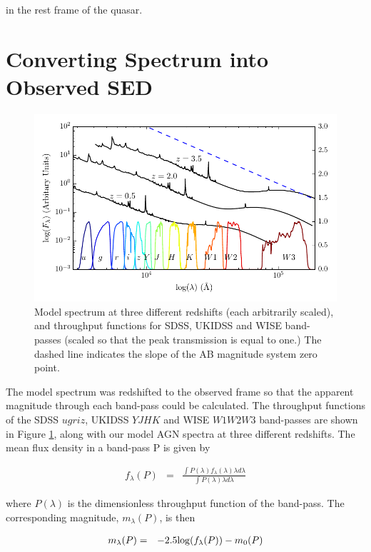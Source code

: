 in the rest frame of the quasar. 

\section{Converting Spectrum into Observed SED}

\begin{figure}
  \centering
  \includegraphics[width=\textwidth]{figures/chapter06/throughput.pdf}
  \caption{Model spectrum at three different redshifts (each arbitrarily scaled), and throughput functions for SDSS, UKIDSS and WISE band-passes (scaled so that the peak transmission is equal to one.) The dashed line indicates the slope of the AB magnitude system zero point.}
  \label{fig:filters}
\end{figure}

The model spectrum was redshifted to the observed frame so that the apparent magnitude through each band-pass could be calculated. The throughput functions of the SDSS $ugriz$, UKIDSS $YJHK$ and WISE $W1W2W3$ band-passes are shown in Figure \ref{fig:filters}, along with our model AGN spectra at three different redshifts. The mean flux density in a band-pass P is given by 

\begin{eqnarray}
  \label{eq:flux}
  f_{\lambda}(P) & = & \frac{\int P(\lambda) f_\lambda(\lambda) \lambda d\lambda }{\int P(\lambda) \lambda d\lambda}
\end{eqnarray}

where $P(\lambda)$ is the dimensionless throughput function of the band-pass. The corresponding magnitude, $m_\lambda(P)$, is then 

\begin{eqnarray}
  m_\lambda(P) & = & -2.5{\rm log}(f_\lambda(P)) - m_0(P)
\end{eqnarray}

